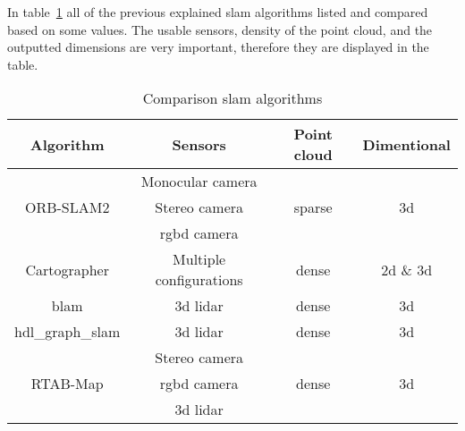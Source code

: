 In table~\ref{tab:slam_comparison} all of the previous explained \acs{slam} algorithms listed and compared based on some values. The usable sensors, density of the point cloud, and the outputted dimensions are very important, therefore they are displayed in the table.

\begin{table}[!h]
  \centering
  \begin{tabular}{| c | c | c | c |}
    \hline
    \textbf{Algorithm} & \textbf{Sensors} & \textbf{Point cloud} & \textbf{Dimentional}\\
    \hline
    \multirow{3}{*}{ORB\hyp{}SLAM2} & Monocular camera & \multirow{3}{*}{sparse} & \multirow{3}{*}{\acs{3d}}\\
    & Stereo camera & &\\
    & \acs{rgbd} camera & &\\
    \hline
    Cartographer & Multiple configurations & dense & \acs{2d} \& \acs{3d}\\
    \hline
    \acs{blam} & \acs{3d} \acs{lidar} & dense & \acs{3d}\\
    \hline
    hdl\_graph\_slam & \acs{3d} \acs{lidar} & dense & \acs{3d}\\
    \hline
    \multirow{3}{*}{RTAB-Map} & Stereo camera & \multirow{3}{*}{dense} & \multirow{3}{*}{\acs{3d}}\\
    & \acs{rgbd} camera & &\\
    & \acs{3d} \acs{lidar} & &\\
    \hline
  \end{tabular}
  \caption{Comparison \acs{slam} algorithms}
  \label{tab:slam_comparison}
\end{table}